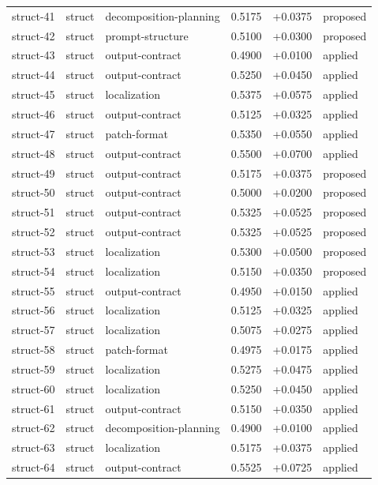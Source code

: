 \begin{center}
\begin{longtable}{llp{5.2cm}rrl}
struct-41 & struct & decomposition-planning & 0.5175 & +0.0375 & proposed \\
struct-42 & struct & prompt-structure & 0.5100 & +0.0300 & proposed \\
struct-43 & struct & output-contract & 0.4900 & +0.0100 & applied \\
struct-44 & struct & output-contract & 0.5250 & +0.0450 & applied \\
struct-45 & struct & localization & 0.5375 & +0.0575 & applied \\
struct-46 & struct & output-contract & 0.5125 & +0.0325 & applied \\
struct-47 & struct & patch-format & 0.5350 & +0.0550 & applied \\
struct-48 & struct & output-contract & 0.5500 & +0.0700 & applied \\
struct-49 & struct & output-contract & 0.5175 & +0.0375 & proposed \\
struct-50 & struct & output-contract & 0.5000 & +0.0200 & proposed \\
struct-51 & struct & output-contract & 0.5325 & +0.0525 & proposed \\
struct-52 & struct & output-contract & 0.5325 & +0.0525 & proposed \\
struct-53 & struct & localization & 0.5300 & +0.0500 & proposed \\
struct-54 & struct & localization & 0.5150 & +0.0350 & proposed \\
struct-55 & struct & output-contract & 0.4950 & +0.0150 & applied \\
struct-56 & struct & localization & 0.5125 & +0.0325 & applied \\
struct-57 & struct & localization & 0.5075 & +0.0275 & applied \\
struct-58 & struct & patch-format & 0.4975 & +0.0175 & applied \\
struct-59 & struct & localization & 0.5275 & +0.0475 & applied \\
struct-60 & struct & localization & 0.5250 & +0.0450 & applied \\
struct-61 & struct & output-contract & 0.5150 & +0.0350 & applied \\
struct-62 & struct & decomposition-planning & 0.4900 & +0.0100 & applied \\
struct-63 & struct & localization & 0.5175 & +0.0375 & applied \\
struct-64 & struct & output-contract & 0.5525 & +0.0725 & applied \\

\end{longtable}
\end{center}

